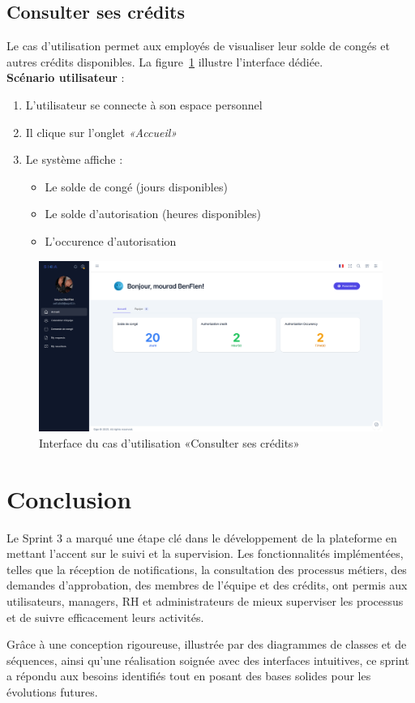 \subsection{Consulter ses crédits}
Le cas d'utilisation permet aux employés de visualiser leur solde de congés et autres crédits disponibles. La figure~\ref{fig:credits} illustre l'interface dédiée.\\
\textbf{Scénario utilisateur} :
\begin{enumerate}
    \item L'utilisateur se connecte à son espace personnel
    \item Il clique sur l'onglet \textit{«Accueil»}
    \item Le système affiche :
    \begin{itemize}
        \item Le solde de congé (jours disponibles)
        \item Le solde d'autorisation (heures disponibles)
        \item L'occurence d'autorisation
    \end{itemize}
\end{enumerate}
\newpage
\begin{figure}[h]
    \centering
    \includegraphics[width=16cm]{images/realisation/csc.png}
    \caption{Interface du cas d'utilisation «Consulter ses crédits»}
    \label{fig:credits}
\end{figure}
\section{Conclusion}
Le Sprint 3 a marqué une étape clé dans le développement de la plateforme en mettant l'accent sur le suivi et la supervision. Les fonctionnalités implémentées, telles que la réception de notifications, la consultation des processus métiers, des demandes d’approbation, des membres de l’équipe et des crédits, ont permis aux utilisateurs, managers, RH et administrateurs de mieux superviser les processus et de suivre efficacement leurs activités. 

Grâce à une conception rigoureuse, illustrée par des diagrammes de classes et de séquences, ainsi qu’une réalisation soignée avec des interfaces intuitives, ce sprint a répondu aux besoins identifiés tout en posant des bases solides pour les évolutions futures.
